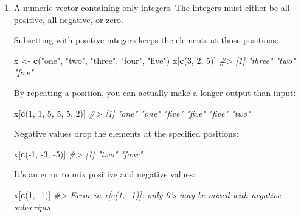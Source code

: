 \documentclass[]{book}
\newenvironment{Shaded}{\begin{snugshade}}{\end{snugshade}}
\newcommand{\KeywordTok}[1]{\textcolor[rgb]{0.13,0.29,0.53}{\textbf{{#1}}}}
\newcommand{\DecValTok}[1]{\textcolor[rgb]{0.00,0.00,0.81}{{#1}}}
\newcommand{\StringTok}[1]{\textcolor[rgb]{0.31,0.60,0.02}{{#1}}}
\newcommand{\CommentTok}[1]{\textcolor[rgb]{0.56,0.35,0.01}{\textit{{#1}}}}
\newcommand{\NormalTok}[1]{{#1}}
\begin{document}
\begin{enumerate}
\def\labelenumi{\arabic{enumi}.}
\item
  A numeric vector containing only integers. The integers must either be
  all positive, all negative, or zero.

  Subsetting with positive integers keeps the elements at those
  positions:

\begin{Shaded}
\begin{Highlighting}[]
\NormalTok{x <-}\StringTok{ }\KeywordTok{c}\NormalTok{(}\StringTok{"one"}\NormalTok{, }\StringTok{"two"}\NormalTok{, }\StringTok{"three"}\NormalTok{, }\StringTok{"four"}\NormalTok{, }\StringTok{"five"}\NormalTok{)}
\NormalTok{x[}\KeywordTok{c}\NormalTok{(}\DecValTok{3}\NormalTok{, }\DecValTok{2}\NormalTok{, }\DecValTok{5}\NormalTok{)]}
\CommentTok{#> [1] "three" "two"   "five"}
\end{Highlighting}
\end{Shaded}

  By repeating a position, you can actually make a longer output than
  input:

\begin{Shaded}
\begin{Highlighting}[]
\NormalTok{x[}\KeywordTok{c}\NormalTok{(}\DecValTok{1}\NormalTok{, }\DecValTok{1}\NormalTok{, }\DecValTok{5}\NormalTok{, }\DecValTok{5}\NormalTok{, }\DecValTok{5}\NormalTok{, }\DecValTok{2}\NormalTok{)]}
\CommentTok{#> [1] "one"  "one"  "five" "five" "five" "two"}
\end{Highlighting}
\end{Shaded}

  Negative values drop the elements at the specified positions:

\begin{Shaded}
\begin{Highlighting}[]
\NormalTok{x[}\KeywordTok{c}\NormalTok{(-}\DecValTok{1}\NormalTok{, -}\DecValTok{3}\NormalTok{, -}\DecValTok{5}\NormalTok{)]}
\CommentTok{#> [1] "two"  "four"}
\end{Highlighting}
\end{Shaded}

  It's an error to mix positive and negative values:

\begin{Shaded}
\begin{Highlighting}[]
\NormalTok{x[}\KeywordTok{c}\NormalTok{(}\DecValTok{1}\NormalTok{, -}\DecValTok{1}\NormalTok{)]}
\CommentTok{#> Error in x[c(1, -1)]: only 0's may be mixed with negative subscripts}
\end{Highlighting}
\end{Shaded}


\end{enumerate}
\end{document}
